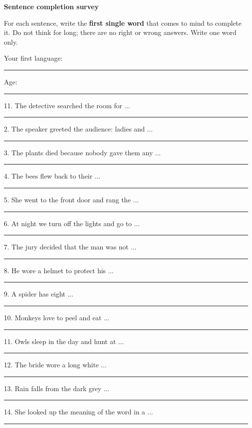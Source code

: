 \documentclass[11pt,a4paper]{article}
\newcommand{\blank}[1][1.2cm]{\rule{#1}{0.4pt}}
\begin{document}
\begin{center}{\LARGE\bfseries Sentence completion survey}\end{center}
For each sentence, write the \textbf{first single word} that comes to mind to complete it. Do not think for long; there are no right or wrong answers. Write one word only.

Your first language: \blank[4cm] \quad Age: \blank[1.5cm]

\begin{multicols}{1}1. The detective searched the room for ...\hfill\blank[3cm]\par\vspace{3pt}
2. The speaker greeted the audience: ladies and ...\hfill\blank[3cm]\par\vspace{3pt}
3. The plants died because nobody gave them any ...\hfill\blank[3cm]\par\vspace{3pt}
4. The bees flew back to their ...\hfill\blank[3cm]\par\vspace{3pt}
5. She went to the front door and rang the ...\hfill\blank[3cm]\par\vspace{3pt}
6. At night we turn off the lights and go to ...\hfill\blank[3cm]\par\vspace{3pt}
7. The jury decided that the man was not ...\hfill\blank[3cm]\par\vspace{3pt}
8. He wore a helmet to protect his ...\hfill\blank[3cm]\par\vspace{3pt}
9. A spider has eight ...\hfill\blank[3cm]\par\vspace{3pt}
10. Monkeys love to peel and eat ...\hfill\blank[3cm]\par\vspace{3pt}
11. Owls sleep in the day and hunt at ...\hfill\blank[3cm]\par\vspace{3pt}
12. The bride wore a long white ...\hfill\blank[3cm]\par\vspace{3pt}
13. Rain falls from the dark grey ...\hfill\blank[3cm]\par\vspace{3pt}
14. She looked up the meaning of the word in a ...\hfill\blank[3cm]\par\vspace{3pt}

\end{multicols}
\end{document}
